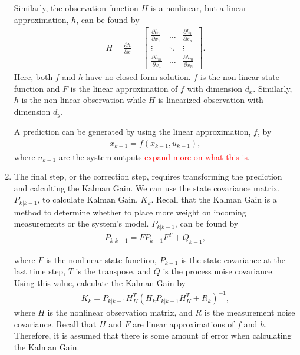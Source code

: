 \begin{enumerate}
  
  Similarly, the observation function $H$ is a nonlinear, but a linear approximation, $h$, can be found by
  \begin{align*}
      H = \frac{\partial h}{\partial x} =
     \begin{bmatrix}
           \frac{\partial h_1}{\partial x_1} & \hdots & \frac{\partial h_1}{\partial x_n} \\
           \vdots & \ddots & \vdots \\
           \frac{\partial h_m}{\partial x_1}  & \hdots & \frac{\partial h_{m}}{\partial x_n}
         \end{bmatrix}  .
  \end{align*}
   Here, both $f$ and $h$ have no closed form solution. $f$ is the non-linear state function and $F$ is the linear approximation of $f$ with dimension $d_x$. Similarly, $h$ is the non linear observation while $H$ is linearized observation with dimension $d_y$. 
   
   
   
  \noindent  A prediction can be generated by using the linear approximation, $f$, by
  \begin{align*}
      x_{k+1} = f( x_{k-1} , u_{k-1})  ,
  \end{align*} 
  where $u_{k-1}$ are the system outputs \textcolor{red}{expand more on what this is}. 
  
  
  
  \item The final step, or the correction step, requires transforming the prediction and calculting the Kalman Gain. We can use the state covariance matrix, $P_{k | k - 1}$, to calculate Kalman Gain, $K_k$.  Recall that the Kalman Gain is a method to determine whether to place more weight on incoming measurements or the system's model. $P_{k | k - 1}$, can be found by
    \begin{align*} 
        P_{k | k -1} = F P_{k - 1} F^T + Q_{k-1} ,
        \end{align*}
        
       where $F$ is the nonlinear state function, $P_{k - 1} $ is the state covariance at the last time step, $T$ is the transpose, and $Q$ is the process noise covariance. Using this value, calculate the Kalman Gain by
         \begin{align*} 
        K_k = P_{k | k - 1} H^T_K (H_k P_{k | k - 1} H^T_K + R_k)^{-1},
    \end{align*}
    where $H$ is the nonlinear observation matrix, and $R$ is the measurement noise covariance.
    Recall that $H$ and $F$ are linear approximations of $f$ and $h$. Therefore, it is assumed that there is some amount of error when calculating the Kalman Gain.
    

\end{enumerate}
